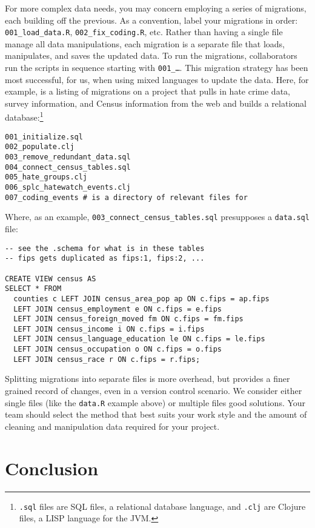 \documentclass[]{article}
\begin{document}
For more complex data needs, you may concern employing a series of migrations,
each building off the previous. As a convention, label your migrations in
order: \texttt{001\_load\_data.R}, \texttt{002\_fix\_coding.R}, etc. Rather than
having a single file manage all data manipulations, each migration is a
separate file that loads, manipulates, and saves the updated data. To run the
migrations, collaborators run the scripts in sequence starting with
\texttt{001\_\ldots}. This migration strategy has been most successful, for us,
when using mixed languages to update the data. Here, for example, is a listing
of migrations on a project that pulls in hate crime data, survey information,
and Census information from the web and builds a relational
database:\footnote{\texttt{.sql} files are SQL files, a relational database
language, and \texttt{.clj} are Clojure files, a LISP language for the JVM.}
\begin{verbatim}
001_initialize.sql
002_populate.clj
003_remove_redundant_data.sql
004_connect_census_tables.sql
005_hate_groups.clj
006_splc_hatewatch_events.clj
007_coding_events # is a directory of relevant files for 
\end{verbatim}
Where, as an example, \texttt{003\_connect\_census\_tables.sql} presupposes a
\texttt{data.sql} file:
\begin{verbatim}
-- see the .schema for what is in these tables
-- fips gets duplicated as fips:1, fips:2, ...

CREATE VIEW census AS
SELECT * FROM 
  counties c LEFT JOIN census_area_pop ap ON c.fips = ap.fips
  LEFT JOIN census_employment e ON c.fips = e.fips
  LEFT JOIN census_foreign_moved fm ON c.fips = fm.fips
  LEFT JOIN census_income i ON c.fips = i.fips
  LEFT JOIN census_language_education le ON c.fips = le.fips
  LEFT JOIN census_occupation o ON c.fips = o.fips
  LEFT JOIN census_race r ON c.fips = r.fips;
\end{verbatim}
Splitting migrations into separate files is more overhead, but provides a
finer grained record of changes, even in a version control scenario. We
consider either single files (like the \texttt{data.R} example above) or
multiple files good solutions. Your team should select the method that best
suits your work style and the amount of cleaning and manipulation data
required for your project.

\section{Conclusion}
\end{document}
